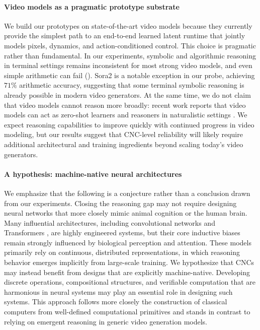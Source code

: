 \paragraph{Video models as a pragmatic prototype substrate}
We build our prototypes on state-of-the-art video models because they currently provide the simplest path to an end-to-end learned latent runtime that jointly models pixels, dynamics, and action-conditioned control. This choice is pragmatic rather than fundamental. In our experiments, symbolic and algorithmic reasoning in terminal settings remains inconsistent for most strong video models, and even simple arithmetic can fail (). Sora2 is a notable exception in our probe, achieving $71\%$ arithmetic accuracy, suggesting that some terminal symbolic reasoning is already possible in modern video generators. At the same time, we do not claim that video models cannot reason more broadly: recent work reports that video models can act as zero-shot learners and reasoners in naturalistic settings \citep{wiedemer2025video}. We expect reasoning capabilities to improve quickly with continued progress in video modeling, but our results suggest that CNC-level reliability will likely require additional architectural and training ingredients beyond scaling today's video generators.

\paragraph{A hypothesis: machine-native neural architectures}
We emphasize that the following is a conjecture rather than a conclusion drawn from our experiments. Closing the reasoning gap may not require designing neural networks that more closely mimic animal cognition or the human brain.
Many influential architectures, including convolutional networks \citep{fukushima1980neocognitron} and Transformers \citep{vaswani2017attention}, are highly engineered systems, but their core inductive biases remain strongly influenced by biological perception and attention. These models primarily rely on continuous, distributed representations, in which reasoning behavior emerges implicitly from large-scale training.
We hypothesize that CNCs may instead benefit from designs that are explicitly machine-native. Developing discrete operations, compositional structures, and verifiable computation that are harmonious in neural systems may play an essential role in designing such systems. This approach follows more closely the construction of classical computers from well-defined computational primitives and stands in contrast to relying on emergent reasoning in generic video generation models.
